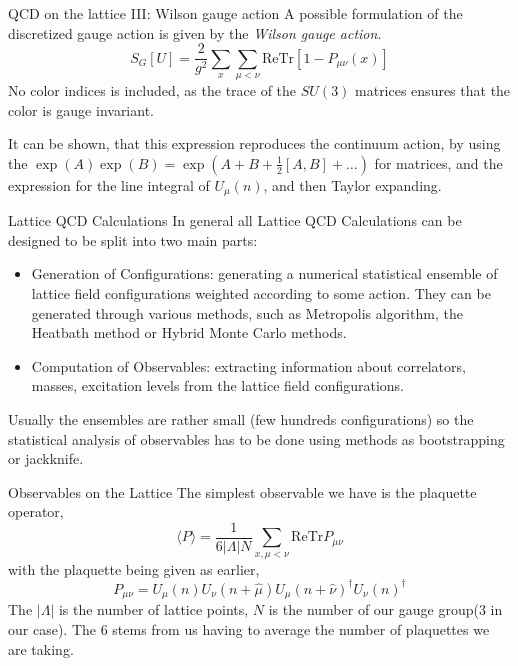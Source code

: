 \documentclass[10pt]{beamer}
\newcommand{\Tr}{\mathrm{Tr}}
\begin{document}
\begin{frame}{QCD on the lattice III: Wilson gauge action}
A possible formulation of the discretized gauge action is given by the \textit{Wilson gauge action}.
\[
S_G[U] = \frac{2}{g^2} \sum_x\sum_{\mu <\nu} \mathrm{Re} \Tr [1-P_{\mu\nu}(x)]
\]
No color indices is included, as the trace of the $SU(3)$ matrices ensures that the color is gauge invariant.

It can be shown, that this expression reproduces the continuum action, by using the $\exp(A)\exp(B)=\exp(A+B+\frac{1}{2}[A,B] + \dots)$ for matrices, and the expression for the line integral of $U_\mu(n)$, and then Taylor expanding.
\end{frame}


\begin{frame}{Lattice QCD Calculations}
In general all Lattice QCD Calculations can be designed to be split into two main parts:
\begin{itemize}
\item Generation of Configurations: generating a numerical statistical ensemble of lattice field configurations weighted according to some action. They can be generated through various methods, such as Metropolis algorithm, the Heatbath method or Hybrid Monte Carlo methods. 
\item Computation of Observables: extracting information about correlators, masses, excitation levels from the lattice field configurations. 
\end{itemize}
Usually the ensembles are rather small (few hundreds configurations) so the statistical analysis of observables has to be done using methods as bootstrapping or jackknife.
\end{frame}


\begin{frame}{Observables on the Lattice}
The simplest observable we have is the plaquette operator,
\[
\langle P \rangle = \frac{1}{6|\Lambda|N}\sum_{x,\mu<\nu} \mathrm{Re}\Tr P_{\mu\nu}
\]
with the plaquette being given as earlier,
\[
P_{\mu\nu} = U_\mu(n)U_\nu(n+\hat{\mu})U_{\mu}(n+\hat{\nu})^\dagger U_{\nu}(n)^\dagger
\]
The $|\Lambda|$ is the number of lattice points, $N$ is the number of our gauge group(3 in our case). The 6 stems from us having to average the number of plaquettes we are taking.
\end{frame}
\end{document}
